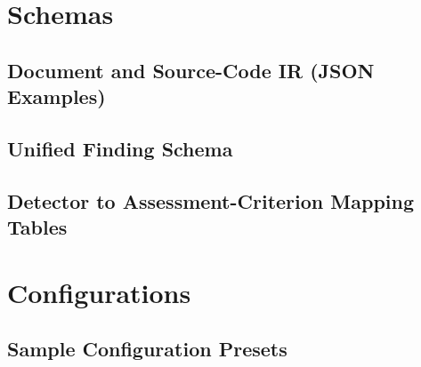 
\chapter{Schemas}\label{app:schemas}

\section{Document and Source-Code IR (JSON Examples)}\label{app:doc-ir}

\section{Unified Finding Schema}\label{app:finding-schema}

\section{Detector to Assessment-Criterion Mapping Tables}\label{app:detector-mapping}


\chapter{Configurations}\label{app:configs}

\section{Sample Configuration Presets}\label{app:presets}
